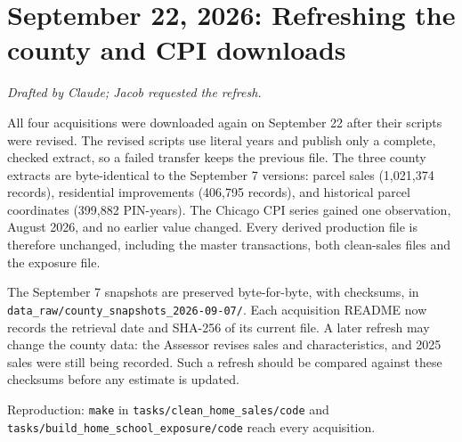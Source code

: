\section*{September 22, 2026: Refreshing the county and CPI downloads}
\textit{Drafted by Claude; Jacob requested the refresh.}

All four acquisitions were downloaded again on September 22 after their
scripts were revised. The revised scripts use literal years and publish only
a complete, checked extract, so a failed transfer keeps the previous file. The
three county extracts are byte-identical to the September 7 versions: parcel
sales (1,021,374 records), residential improvements (406,795 records), and
historical parcel coordinates (399,882 PIN-years). The Chicago CPI series
gained one observation, August 2026, and no earlier value changed. Every
derived production file is therefore unchanged, including the master
transactions, both clean-sales files and the exposure file.

The September 7 snapshots are preserved byte-for-byte, with checksums, in
\texttt{data\_raw/county\_snapshots\_2026-09-07/}. Each acquisition README now
records the retrieval date and SHA-256 of its current file. A later refresh
may change the county data: the Assessor revises sales and characteristics,
and 2025 sales were still being recorded. Such a refresh should be compared
against these checksums before any estimate is updated.

\small
Reproduction: \texttt{make} in \texttt{tasks/clean\_home\_sales/code} and
\texttt{tasks/build\_home\_school\_exposure/code} reach every acquisition.
\normalsize
